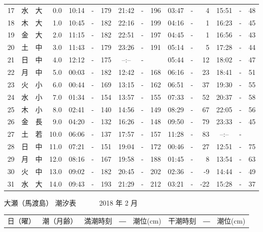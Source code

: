 \documentclass[12pt.a4j]{jsarticle}
\begin{document}
\begin{center}
\begin{table}[ht]
\begin{tabular}{|rc|cr|ccrccr|ccrccr|}
17 & 水 & 大 &  0.0 &  10:14 &-& 179  &  21:42 &-& 196  &   03:47 &-&   4  &   15:51 &-&  48  \\
18 & 木 & 大 &  1.0 &  10:45 &-& 182  &  22:16 &-& 199  &   04:16 &-&   1  &   16:23 &-&  45  \\
19 & 金 & 大 &  2.0 &  11:15 &-& 182  &  22:51 &-& 197  &   04:45 &-&   1  &   16:56 &-&  43  \\
20 & 土 & 中 &  3.0 &  11:43 &-& 179  &  23:26 &-& 191  &   05:14 &-&   5  &   17:28 &-&  44  \\
21 & 日 & 中 &  4.0 &  12:12 &-& 175  &  --:-- &-&     &   05:44 &-&  12  &   18:02 &-&  47  \\
22 & 月 & 中 &  5.0 &  00:03 &-& 182  &  12:42 &-& 168  &   06:16 &-&  23  &   18:41 &-&  51  \\
23 & 火 & 小 &  6.0 &  00:44 &-& 169  &  13:15 &-& 162  &   06:51 &-&  37  &   19:30 &-&  55  \\
24 & 水 & 小 &  7.0 &  01:34 &-& 154  &  13:57 &-& 155  &   07:33 &-&  52  &   20:37 &-&  58  \\
25 & 木 & 小 &  8.0 &  02:41 &-& 140  &  14:56 &-& 149  &   08:29 &-&  67  &   22:05 &-&  56  \\
26 & 金 & 長 &  9.0 &  04:20 &-& 132  &  16:26 &-& 148  &   09:50 &-&  79  &   23:33 &-&  45  \\
27 & 土 & 若 & 10.0 &  06:06 &-& 137  &  17:57 &-& 157  &   11:28 &-&  83  &   --:-- &-&     \\
28 & 日 & 中 & 11.0 &  07:21 &-& 151  &  19:04 &-& 172  &   00:46 &-&  27  &   12:51 &-&  75  \\
29 & 月 & 中 & 12.0 &  08:16 &-& 167  &  19:58 &-& 188  &   01:45 &-&   8  &   13:54 &-&  63  \\
30 & 火 & 中 & 13.0 &  09:02 &-& 182  &  20:45 &-& 202  &   02:36 &-&  -9  &   14:44 &-&  49  \\
31 & 水 & 大 & 14.0 &  09:43 &-& 193  &  21:29 &-& 212  &   03:21 &-& -22  &   15:28 &-&  37  \\
   \hline
   \end{tabular}
\end{table}
\newpage
 {\LARGE 大瀬（馬渡島）  潮汐表　　　}
 {\large 2018 年  2 月}\\
 \begin{table}[ht]
    \begin{tabular}{|rc|cr|ccrccr|ccrccr|}
    \hline
    \multicolumn{2}{|c|}{日（曜）} & \multicolumn{2}{c|}{潮（月齢）} & \multicolumn{6}{c|}{満潮時刻　―　潮位(cm)} & \multicolumn{6}{c|}{干潮時刻　―　潮位(cm)} \\

\end{tabular}
\end{table}
\end{center}
\end{document}
